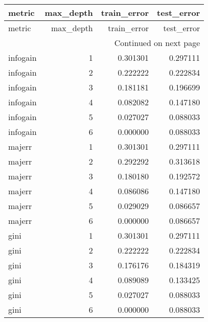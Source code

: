 \begin{longtable}{lrrr}
\toprule
  metric &  max\_depth &  train\_error &  test\_error \\
\midrule
\endfirsthead

\toprule
  metric &  max\_depth &  train\_error &  test\_error \\
\midrule
\endhead
\midrule
\multicolumn{4}{r}{{Continued on next page}} \\
\midrule
\endfoot

\bottomrule
\endlastfoot
infogain &          1 &     0.301301 &    0.297111 \\
infogain &          2 &     0.222222 &    0.222834 \\
infogain &          3 &     0.181181 &    0.196699 \\
infogain &          4 &     0.082082 &    0.147180 \\
infogain &          5 &     0.027027 &    0.088033 \\
infogain &          6 &     0.000000 &    0.088033 \\
  majerr &          1 &     0.301301 &    0.297111 \\
  majerr &          2 &     0.292292 &    0.313618 \\
  majerr &          3 &     0.180180 &    0.192572 \\
  majerr &          4 &     0.086086 &    0.147180 \\
  majerr &          5 &     0.029029 &    0.086657 \\
  majerr &          6 &     0.000000 &    0.086657 \\
    gini &          1 &     0.301301 &    0.297111 \\
    gini &          2 &     0.222222 &    0.222834 \\
    gini &          3 &     0.176176 &    0.184319 \\
    gini &          4 &     0.089089 &    0.133425 \\
    gini &          5 &     0.027027 &    0.088033 \\
    gini &          6 &     0.000000 &    0.088033 \\
\end{longtable}
